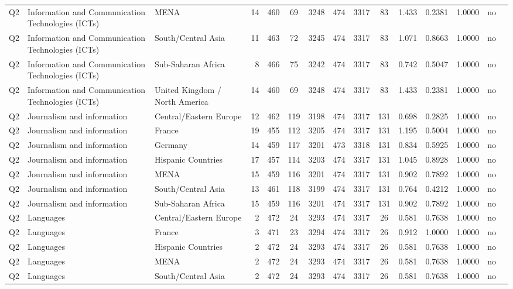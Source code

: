 \begin{longtable}{lllrcccccccccll}
Q2 & Information and Communication Technologies (ICTs) & MENA & 14 & 460 & 69 & 3248 & 474 & 3317 & 83 & 1.433 & 0.2381 & 1.0000 & no \\
Q2 & Information and Communication Technologies (ICTs) & South/Central Asia & 11 & 463 & 72 & 3245 & 474 & 3317 & 83 & 1.071 & 0.8663 & 1.0000 & no \\
Q2 & Information and Communication Technologies (ICTs) & Sub-Saharan Africa & 8 & 466 & 75 & 3242 & 474 & 3317 & 83 & 0.742 & 0.5047 & 1.0000 & no \\
Q2 & Information and Communication Technologies (ICTs) & United Kingdom / North America & 14 & 460 & 69 & 3248 & 474 & 3317 & 83 & 1.433 & 0.2381 & 1.0000 & no \\
Q2 & Journalism and information & Central/Eastern Europe & 12 & 462 & 119 & 3198 & 474 & 3317 & 131 & 0.698 & 0.2825 & 1.0000 & no \\
Q2 & Journalism and information & France & 19 & 455 & 112 & 3205 & 474 & 3317 & 131 & 1.195 & 0.5004 & 1.0000 & no \\
Q2 & Journalism and information & Germany & 14 & 459 & 117 & 3201 & 473 & 3318 & 131 & 0.834 & 0.5925 & 1.0000 & no \\
Q2 & Journalism and information & Hispanic Countries & 17 & 457 & 114 & 3203 & 474 & 3317 & 131 & 1.045 & 0.8928 & 1.0000 & no \\
Q2 & Journalism and information & MENA & 15 & 459 & 116 & 3201 & 474 & 3317 & 131 & 0.902 & 0.7892 & 1.0000 & no \\
Q2 & Journalism and information & South/Central Asia & 13 & 461 & 118 & 3199 & 474 & 3317 & 131 & 0.764 & 0.4212 & 1.0000 & no \\
Q2 & Journalism and information & Sub-Saharan Africa & 15 & 459 & 116 & 3201 & 474 & 3317 & 131 & 0.902 & 0.7892 & 1.0000 & no \\
Q2 & Languages & Central/Eastern Europe & 2 & 472 & 24 & 3293 & 474 & 3317 & 26 & 0.581 & 0.7638 & 1.0000 & no \\
Q2 & Languages & France & 3 & 471 & 23 & 3294 & 474 & 3317 & 26 & 0.912 & 1.0000 & 1.0000 & no \\
Q2 & Languages & Hispanic Countries & 2 & 472 & 24 & 3293 & 474 & 3317 & 26 & 0.581 & 0.7638 & 1.0000 & no \\
Q2 & Languages & MENA & 2 & 472 & 24 & 3293 & 474 & 3317 & 26 & 0.581 & 0.7638 & 1.0000 & no \\
Q2 & Languages & South/Central Asia & 2 & 472 & 24 & 3293 & 474 & 3317 & 26 & 0.581 & 0.7638 & 1.0000 & no \\

\end{longtable}
